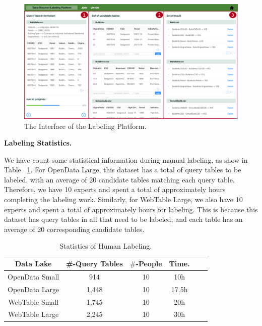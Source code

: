 \begin{figure}[h]
	\centering
	\includegraphics[width=1.0\linewidth]{fig/interface.pdf}
	\caption{The Interface of the Labeling Platform.}
	\label{fig:interface}
\end{figure}

\noindent \textbf{Labeling Statistics.} 


We have count some statistical information during manual labeling, as show in Table ~\ref{Table:humanLabeling}. For OpenData Large, this dataset has a total of   query tables to be labeled, with an average of 20 candidate tables matching each query table. Therefore, we have 10 experts and spent a total of approximately  hours completing the labeling work. Similarly, for WebTable Large, we also have 10 experts and spent a total of approximately  hours for labeling. This is because this dataset has  query tables in all that need to be labeled, and each table has an average of 20 corresponding candidate tables.

\begin{table}[t]
	\centering
	\caption{Statistics of Human Labeling.}
	\begin{tabular}{|c|c|c|c|c|c|}
		\hline
		\centering
		Data Lake  & \#-Query Tables & $\#$-People & Time.   \\
		\hline  
		OpenData Small& 914  & 10 & 10h   \\
		\hline
		OpenData Large& 1,448  & 10  &  17.5h   \\
		\hline
		WebTable Small& 1,745   & 10 &  20h  \\
		\hline
		WebTable Large& 2,245  & 10 &  30h  \\
		\hline
	\end{tabular}
	\label{Table:humanLabeling}
	
\end{table}